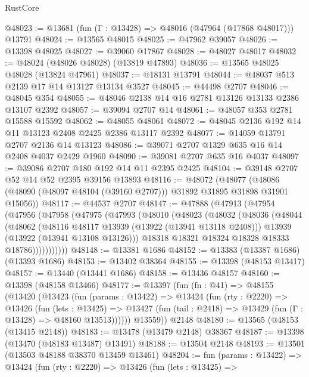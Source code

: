 \begin{lexlean}{RustCore}
\begin{coremodule}
@48023 := @13681 (fun (Γ : @13428) => @48016 (@47964 (@17868 @48017))) @13791
@48024 := @13565 @48015
@48025 := @47962 @39057
@48026 := @13398 @48025
@48027 := @39060 @17867
@48028 := @48027 @48017
@48032 := @48024 (@48026 @48028) (@13819 @47893)
@48036 := @13565 @48025 @48028 (@13824 @47961)
@48037 := @18131 @13791
@48044 := @48037 @513 @2139 @17 @14 @13127 @13134 @3527
@48045 := @44498 @2707
@48046 := @48045 @354
@48055 := @48046 @2138 @14 @16 @2781 @13126 @13133 @2386 @13107 @2392
@48057 := @39094 @2707 @14
@48061 := @48057 @353 @2781 @15588 @15592
@48062 := @48055 @48061
@48072 := @48045 @2136 @192 @14 @11 @13123 @2408 @2425 @2386 @13117 @2392
@48077 := @14059 @13791 @2707 @2136 @14 @13123
@48086 := @39071 @2707 @1329 @635 @16 @14 @2408 @4037 @2429 @1960
@48090 := @39081 @2707 @635 @16 @4037
@48097 := @39086 @2707 @180 @192 @14 @11 @2395 @2425
@48104 := @39148 @2707 @52 @14 @52 @2395 @39156 @13893
@48116 := @48072
    (@48077 (@48086 (@48090 (@48097 @48104 (@39160 @2707))) @31892 @31895 @31898 @31901 @15056))
@48117 := @44537 @2707
@48147 := @47888
    (@47913
      (@47954
        (@47956
          (@47958
            (@47975
              (@47993
                (@48010
                  (@48023
                    (@48032
                      (@48036
                        (@48044
                          (@48062
                            (@48116 @48117 @13939 (@13922 (@13941 @13118 @2408)))
                            @13939
                            (@13922 (@13941 @13108 @13126)))
                          @18318
                          @18321
                          @18324
                          @18328
                          @18333
                          @18786)))))))))))
@48148 := @13381 @1686
@48152 := @13383 (@13387 @1686) (@13393 @1686)
@48153 := @13402 @38364
@48155 := @13398 (@48153 @13417)
@48157 := @13440 (@13441 @1686)
@48158 := @13436 @48157
@48160 := @13398 (@48158 @13466)
@48177 := @13397
    (fun (fn : @41) =>
    @48155
      (@13420
        (@13423
          (fun (params : @13422) =>
          @13424
            (fun (rty : @2220) =>
            @13426
              (fun (lets : @13425) =>
              @13427 (fun (tail : @2418) => @13429 (fun (Γ : @13428) => @48160 @13513))))))
        @13559))
    @2148
@48180 := @13565 (@48153 (@13415 @2148))
@48183 := @13478 (@13479 @2148) @38367
@48187 := @13398 (@13470 (@48183 @13487) @13491)
@48188 := @13504 @2148
@48193 := @13501 (@13503 @48188 @38370 @13459 @13461)
@48204 := fun (params : @13422) =>
  @13424
    (fun (rty : @2220) =>
    @13426
      (fun (lets : @13425) =>

\end{coremodule}
\end{lexlean}
